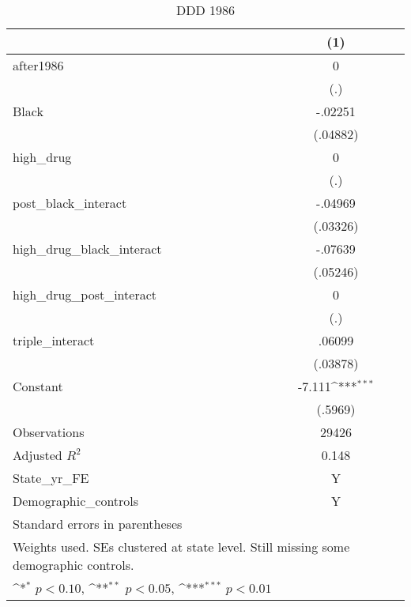\begin{table}[htbp]\centering
\def\sym#1{\ifmmode^{#1}\else\(^{#1}\)\fi}
\caption{DDD 1986}
\begin{tabular}{l*{1}{c}}
\hline\hline
                    &\multicolumn{1}{c}{(1)}         \\
\hline
after1986           &           0         \\
                    &         (.)         \\
[1em]
Black               &     -.02251         \\
                    &    (.04882)         \\
[1em]
high\_drug           &           0         \\
                    &         (.)         \\
[1em]
post\_black\_interact &     -.04969         \\
                    &    (.03326)         \\
[1em]
high\_drug\_black\_interact&     -.07639         \\
                    &    (.05246)         \\
[1em]
high\_drug\_post\_interact&           0         \\
                    &         (.)         \\
[1em]
triple\_interact     &      .06099         \\
                    &    (.03878)         \\
[1em]
Constant            &      -7.111\sym{***}\\
                    &     (.5969)         \\
\hline
Observations        &       29426         \\
Adjusted \(R^{2}\)  &       0.148         \\
State\_yr\_FE         &           Y         \\
Demographic\_controls&           Y         \\
\hline\hline
\multicolumn{2}{l}{\footnotesize Standard errors in parentheses}\\
\multicolumn{2}{l}{\footnotesize Weights used. SEs clustered at state level. Still missing some demographic controls.}\\
\multicolumn{2}{l}{\footnotesize \sym{*} \(p<0.10\), \sym{**} \(p<0.05\), \sym{***} \(p<0.01\)}\\
\end{tabular}
\end{table}
